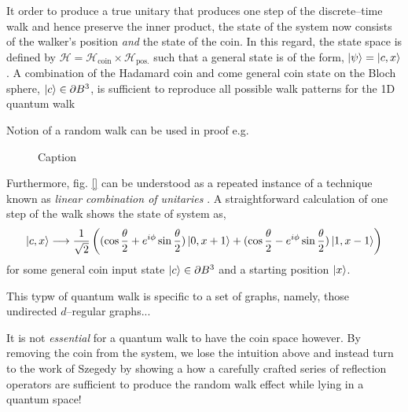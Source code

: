 \documentclass{article}
\begin{document}
It order to produce a true unitary that produces one step of the discrete--time walk and hence preserve the inner product, the state of the system now consists of the walker's position \emph{and} the state of the coin. In this regard, the state space is defined by $\mathcal{H} = \mathcal{H}_{\text{coin}}\times\mathcal{H}_{\text{pos.}}$ such that a general state is of the form, $\ket{\psi}=\ket{c,x}$. A combination of the Hadamard coin and come general coin state on the Bloch sphere, $\ket{c}\in\partial B^3$, is sufficient to reproduce all possible walk patterns for the 1D quantum walk \cite{portugalbook}



Notion of a random walk can be used in proof e.g. \cite{BBT06}

\begin{figure}[h!]
    \centering
    \caption{Caption}
    \label{fig:enter-label}
\end{figure}

Furthermore, fig. \ref{} can be understood as a repeated instance of a technique known as \emph{linear combination of unitaries} \cite{CW12}. A straightforward calculation of one step of the walk shows the state of system as,
\begin{equation}
    \ket{c,x} \longrightarrow \frac{1}{\sqrt{2}}\left( (\cos\frac{\theta}{2} + e^{i\phi}\sin\frac{\theta}{2})\ket{0,x+1} + (\cos\frac{\theta}{2} - e^{i\phi}\sin\frac{\theta}{2})\ket{1,x-1}\right)
\end{equation}
for some general coin input state $\ket{c}\in\partial B^3$ and a starting position $\ket{x}$.

This typw of quantum walk is specific to a set of graphs, namely, those undirected $d$--regular graphs...

It is not \emph{essential} for a quantum walk to have the coin space however. By removing the coin from the system, we lose the intuition above and instead turn to the work of Szegedy by showing a how a carefully crafted series of reflection operators are sufficient to produce the  random walk effect while lying in a quantum space!
\end{document}
